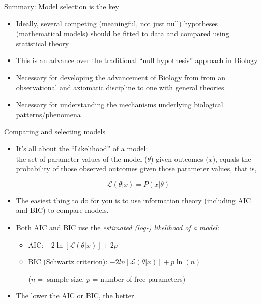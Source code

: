 \documentclass[xcolor=x11names,compress]{beamer}
\renewcommand{\(}{\begin{columns}}
\renewcommand{\)}{\end{columns}}
\newcommand{\<}[1]{\begin{column}{#1}}
\renewcommand{\>}{\end{column}}
\begin{document}
\begin{frame}{Summary: Model selection is the key}

\begin{itemize}[<+->]\itemsep12pt
	\item Ideally, several competing (meaningful, not just null) hypotheses (mathematical models) should be fitted to data and compared using statistical theory 
	\item This is an advance over the traditional ``null hypothesis'' approach in Biology
	\item Necessary for developing the advancement of Biology from from an observational and axiomatic discipline to one with general theories.
	\item Necessary for understanding the mechanisms underlying biological patterns/phenomena
\end{itemize}
 
 \end{frame}


\begin{frame}{Comparing and selecting models}

\begin{itemize}\itemsep12pt
	
	\item It's all about the ``Likelihood'' of a model: \\
	the set of parameter values of the	model ($\theta$) given outcomes ($x$),
	equals the probability of those observed outcomes given those parameter
	values, that is,

	$$ \mathcal{L}(\theta |x) = P(x | \theta)$$

	\item The easiest thing to do for you is to use information theory
	(including AIC and BIC) to compare models. 

	\item Both AIC and BIC use the {\it estimated (log-) likelihood of a model}:\\
	
	\begin{itemize}
		
		\item AIC: $-2 \ln[\mathcal{L}(\theta |x)] + 2p$\\

		\item BIC (Schwartz criterion): $-2 ln[\mathcal{L}(\theta |x) ] + p \ln(n)$
		
		($n = $ sample size, $p$ = number of free parameters)	
	\end{itemize}
	
	
	\item The lower the AIC or BIC, the better. 

\end{itemize}

\end{frame}
\end{document}
